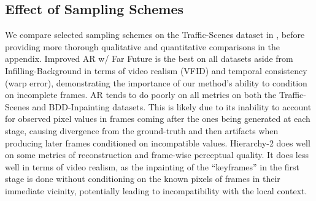 \subsection{Effect of Sampling Schemes}
We compare selected sampling schemes on the Traffic-Scenes dataset in , before providing more thorough qualitative and quantitative comparisons in the appendix. Improved AR w/ Far Future is the best on all datasets aside from Infilling-Background in terms of video realism (VFID) and temporal consistency (warp error), demonstrating the importance of our method's ability to condition on incomplete frames. AR tends to do poorly on all metrics on both the Traffic-Scenes and BDD-Inpainting datasets. This is likely due to its inability to account for observed pixel values in frames coming after the ones being generated at each stage, causing divergence from the ground-truth and then artifacts when producing later frames conditioned on incompatible values. Hierarchy-2 does well on some metrics of reconstruction and frame-wise perceptual quality. It does less well in terms of video realism, as the inpainting of the ``keyframes'' in the first stage is done without conditioning on the known pixels of frames in their immediate vicinity, potentially leading to incompatibility with the local context.
\begin{table}[t]
\centering
\caption{Effect of sampling schemes, measured on the Traffic-Scenes test set.}
\label{table:samplingschemes}
\end{table}

